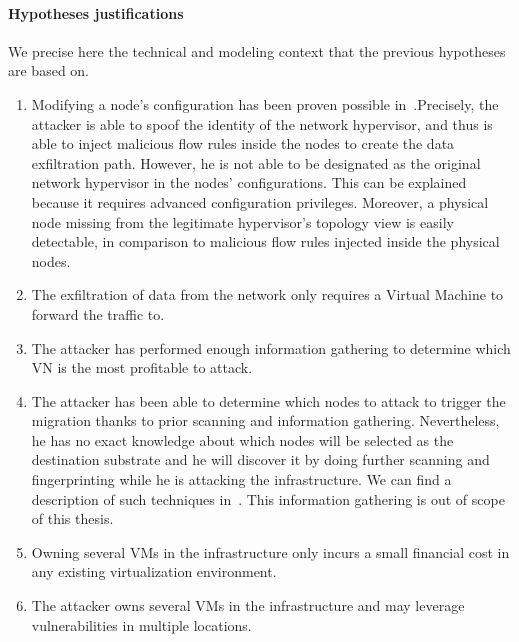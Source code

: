 \paragraph{Hypotheses justifications}
We precise here the technical and modeling context that the previous hypotheses are based on.

\begin{enumerate}
    \item Modifying a node's configuration has been proven  possible in~\cite{Taxonomy_Hizver2015, Bokani2015, attain-Ujcich2017}.Precisely, the attacker is able to spoof the identity of the network hypervisor, and thus is able to inject malicious flow rules inside the nodes to create the data exfiltration path. 
    However, he is not able to be designated as the original network hypervisor in the nodes' configurations. 
    This can be explained because it requires advanced configuration privileges. Moreover, a physical node missing from the legitimate hypervisor's topology view is easily detectable, in comparison to malicious flow rules injected inside the physical nodes.
    
    \item The exfiltration of data from the network only requires a Virtual Machine to forward the traffic to.
    
    \item The attacker has performed enough information gathering to determine which VN is the most profitable to attack.
    
    \item The attacker has been able to determine which nodes to attack to trigger the migration thanks to prior scanning and information gathering. 
    Nevertheless, he has no exact knowledge about which nodes will be selected as the destination substrate and he will discover it by doing further scanning and fingerprinting  while he is attacking the infrastructure.  
    We can find a description of such techniques in~\cite{Hong2015,Sphinx-Dhawan2015}.
    This information gathering is out of scope of this thesis.
    
    \item Owning several VMs in the infrastructure only incurs a small financial cost in any existing virtualization environment.
    
    \item The attacker owns several VMs in the infrastructure and may leverage vulnerabilities in multiple locations.
    

\end{enumerate}
